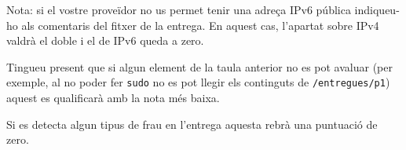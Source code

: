 \documentclass{practicaitic}
\begin{document}
Nota: si el vostre proveïdor no us permet tenir una adreça IPv6 pública
indiqueu-ho als comentaris del fitxer de la entrega. En aquest cas, l'apartat
sobre IPv4 valdrà el doble i el de IPv6 queda a zero.

Tingueu present que si algun element de la taula anterior no es pot avaluar
(per exemple, al no poder fer \texttt{sudo} no es pot llegir els continguts de \texttt{/entregues/p1})
aquest es qualificarà amb la nota més baixa.

Si es detecta algun tipus de frau en l'entrega aquesta rebrà una puntuació de zero.
\end{document}
